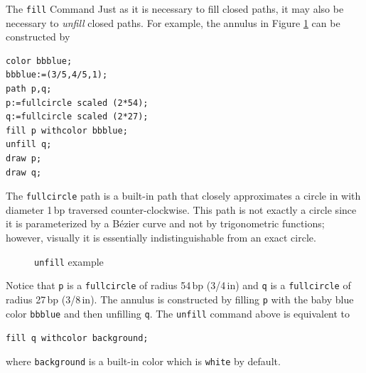 \begin{subsection}{The \texttt{fill} Command}
Just as it is necessary to fill closed paths, it may also be necessary to \textit{unfill} closed paths.  For example, the annulus in Figure \ref{fig:annulus1} can be constructed by
\begin{lstlisting}[xleftmargin=38bp]
color bbblue;
bbblue:=(3/5,4/5,1);
path p,q;
p:=fullcircle scaled (2*54);
q:=fullcircle scaled (2*27);
fill p withcolor bbblue;
unfill q;
draw p;
draw q;
\end{lstlisting}
The \texttt{fullcircle} path is a built-in path that closely approximates a circle in \MP{} with diameter 1\,bp traversed counter-clockwise.  This path is not exactly a circle since it is parameterized by a B\'{e}zier curve and not by trigonometric functions; however, visually it is essentially indistinguishable from an exact circle.
\begin{figure}[t]
	\begin{center}\end{center}
	\caption{\texttt{unfill} example}\label{fig:annulus1}
\end{figure}
Notice that \texttt{p} is a \texttt{fullcircle} of radius 54\,bp (3/4\,in) and \texttt{q} is a \texttt{fullcircle} of radius 27\,bp (3/8\,in).  The annulus is constructed by filling \texttt{p} with the baby blue color \texttt{bbblue} and then unfilling \texttt{q}.  The \texttt{unfill} command above is equivalent to \begin{center}\verb|fill q withcolor background;|\end{center} where \texttt{background} is a built-in color which is \texttt{white} by default.


\end{subsection}
